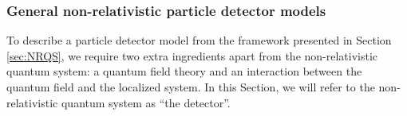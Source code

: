 \documentclass[letterpaper,12pt,titlepage,oneside,final]{book}
\newcommand{\mf}{\mathsf}%
\begin{document}
\subsubsection*{General non-relativistic particle detector models}\label{sub:generalPDs}


To describe a particle detector model from the framework presented in Section \ref{sec:NRQS}, we require two extra ingredients apart from the non-relativistic quantum system: a quantum field theory and an interaction between the quantum field and the localized system. In this Section, we will refer to the non-relativistic quantum system as ``the detector''.

\end{document}
